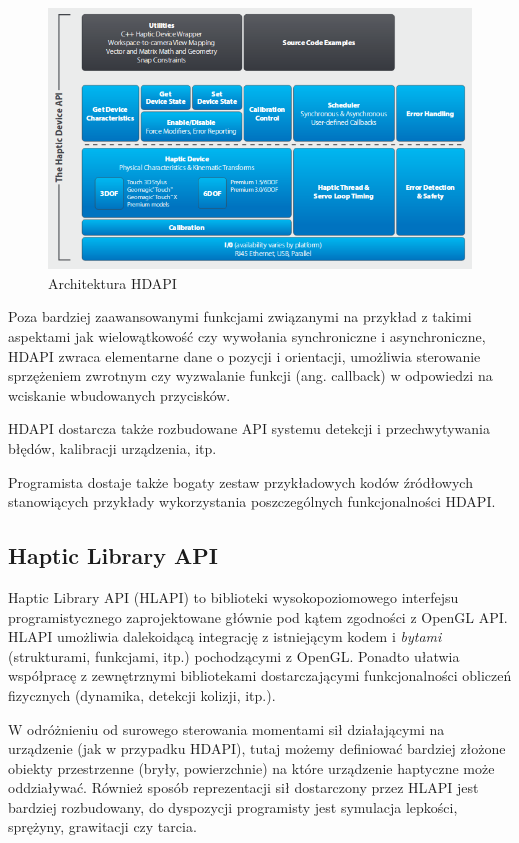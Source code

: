 \documentclass[licencjacka]{pracamgr}
\begin{document}
\begin{figure}[H]
\centering
\includegraphics[scale=0.65,center]{hdapi}
\caption{Architektura HDAPI}
\end{figure}

Poza bardziej zaawansowanymi funkcjami związanymi na przykład z takimi aspektami jak wielowątkowość czy wywołania synchroniczne i asynchroniczne, HDAPI zwraca elementarne dane o pozycji i orientacji, umożliwia sterowanie sprzężeniem zwrotnym czy wyzwalanie funkcji (ang. callback) w odpowiedzi na wciskanie wbudowanych przycisków.

HDAPI dostarcza także rozbudowane API systemu detekcji i przechwytywania błędów, kalibracji urządzenia, itp.

Programista dostaje także bogaty zestaw przykładowych kodów źródłowych stanowiących przykłady wykorzystania poszczególnych funkcjonalności HDAPI.

\subsection{Haptic Library API}
Haptic Library API (HLAPI) to biblioteki wysokopoziomowego interfejsu programistycznego zaprojektowane głównie pod kątem zgodności z OpenGL API. HLAPI umożliwia dalekoidącą integrację z istniejącym kodem i \textit{bytami} (strukturami, funkcjami, itp.) pochodzącymi z OpenGL. Ponadto ułatwia współpracę z zewnętrznymi bibliotekami dostarczającymi funkcjonalności obliczeń fizycznych (dynamika, detekcji kolizji, itp.).

W odróżnieniu od surowego sterowania momentami sił działającymi na urządzenie (jak w przypadku HDAPI), tutaj możemy definiować bardziej złożone obiekty przestrzenne (bryły, powierzchnie) na które urządzenie haptyczne może oddziaływać. Również sposób reprezentacji sił dostarczony przez HLAPI jest bardziej rozbudowany, do dyspozycji programisty jest symulacja lepkości, sprężyny, grawitacji czy  tarcia.
\end{document}
